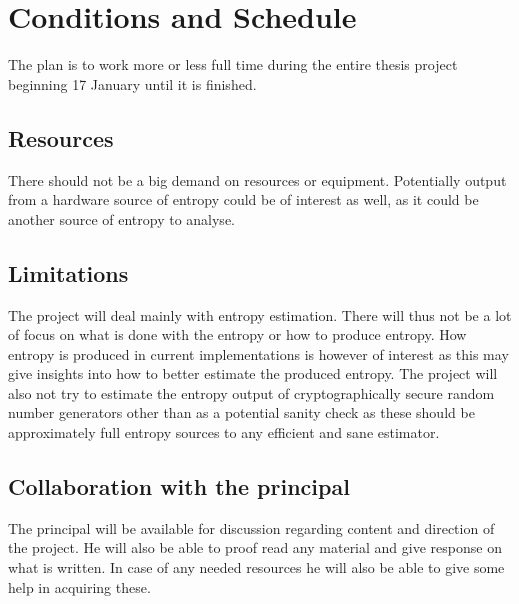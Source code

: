 \documentclass[a4paper,11pt]{report}
\begin{document}
\section*{Conditions and Schedule}
The plan is to work more or less full time during the entire thesis project
beginning 17 January until it is finished.
\subsection*{Resources}
There should not be a big demand on resources or equipment.
Potentially output from a hardware source of entropy could be of interest
as well, as it could be another source of entropy to analyse.
\subsection*{Limitations}
The project will deal mainly with entropy estimation. There will thus not be a
lot of focus on what is done with the entropy or how to produce entropy. How 
entropy is produced in current implementations is however of interest as this 
may give insights into how to better estimate the produced entropy. The project
will also not try to estimate the entropy output of cryptographically secure 
random number generators other than as a potential sanity check as these should
be approximately full entropy sources to any efficient and sane estimator.
\subsection*{Collaboration with the principal}
The principal will be available for discussion regarding content and direction
of the project. He will also be able to proof read any material and give 
response on what is written. In case of any needed resources he will also be 
able to give some help in acquiring these.
\end{document}
